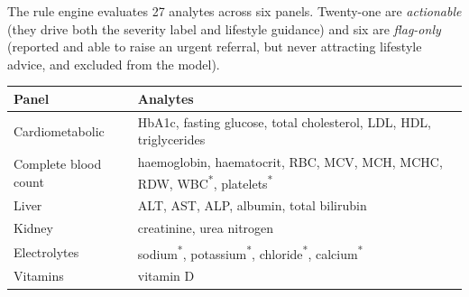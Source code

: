 \documentclass[11pt,a4paper]{article}
\begin{document}
The rule engine evaluates 27 analytes across six panels. Twenty-one are
\emph{actionable} (they drive both the severity label and lifestyle guidance) and
six are \emph{flag-only} (reported and able to raise an urgent referral, but never
attracting lifestyle advice, and excluded from the model).

\begin{table}[h!]
\centering
\renewcommand{\arraystretch}{1.1}
\begin{tabular}{|l|p{11.5cm}|}
\hline
\textbf{Panel} & \textbf{Analytes} \\
\hline
Cardiometabolic & HbA1c, fasting glucose, total cholesterol, LDL, HDL, triglycerides \\
\hline
Complete blood count & haemoglobin, haematocrit, RBC, MCV, MCH, MCHC, RDW, WBC\textsuperscript{*}, platelets\textsuperscript{*} \\
\hline
Liver & ALT, AST, ALP, albumin, total bilirubin \\
\hline
Kidney & creatinine, urea nitrogen \\
\hline
Electrolytes & sodium\textsuperscript{*}, potassium\textsuperscript{*}, chloride\textsuperscript{*}, calcium\textsuperscript{*} \\
\hline
Vitamins & vitamin D \\
\hline
\end{tabular}
\end{table}

\end{document}
